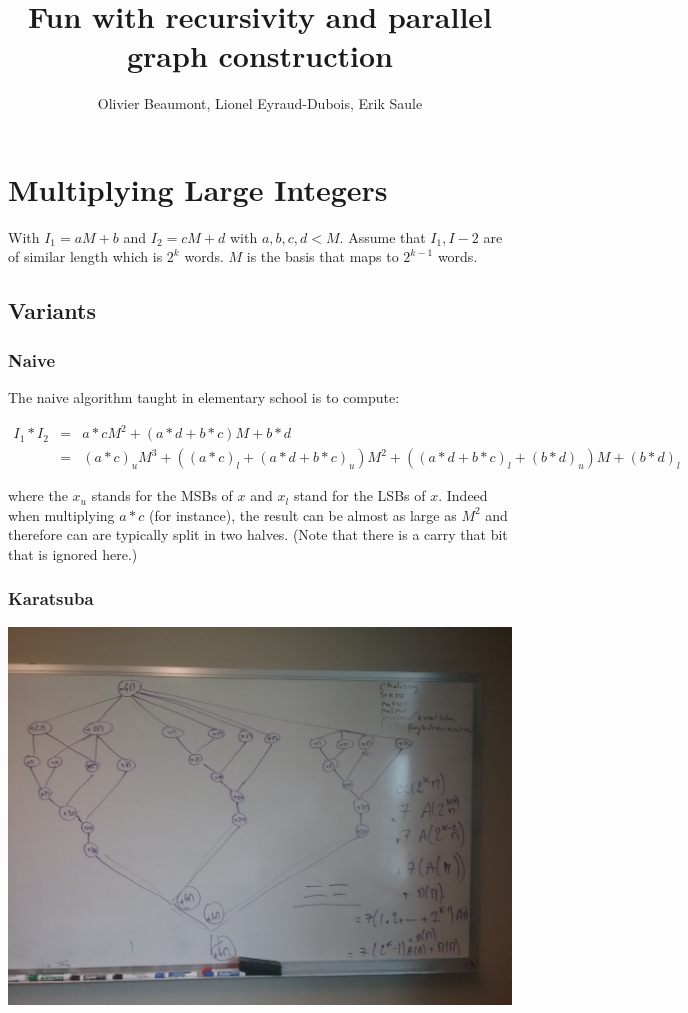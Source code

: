 \documentclass{article}
\author{Olivier Beaumont, Lionel Eyraud-Dubois, Erik Saule}
\title{Fun with recursivity and parallel graph construction}
\begin{document}
\maketitle

\section{Multiplying Large Integers}

With $I_1 = aM + b$ and $I_2 = cM + d$ with $a,b,c,d < M$. Assume that
$I_1, I-2$ are of similar length which is $2^k$ words. $M$ is the
basis that maps to $2^{k-1}$ words.

\subsection{Variants}

\subsubsection{Naive}

The naive algorithm taught in elementary school is to compute:

\begin{align}
  I_1 * I_2 & = & a*c M^2 + (a * d + b * c ) M + b*d \\
            & = & (a*c)_{u} M^3 + ((a*c)_{l} + (a * d + b * c )_{u}) M^2 + ( (a * d + b * c )_{l} + (b*d)_{u} ) M + (b*d)_{l}
\end{align}

where the $x_u$ stands for the MSBs of $x$ and $x_l$ stand for the
LSBs of $x$. Indeed when multiplying $a*c$ (for instance), the result
can be almost as large as $M^2$ and therefore can are typically split
in two halves. (Note that there is a carry that bit that is ignored
here.)

\subsubsection{Karatsuba}

\includegraphics[width=.5\linewidth]{../../notes/20180608_120848.jpg}
\end{document}
